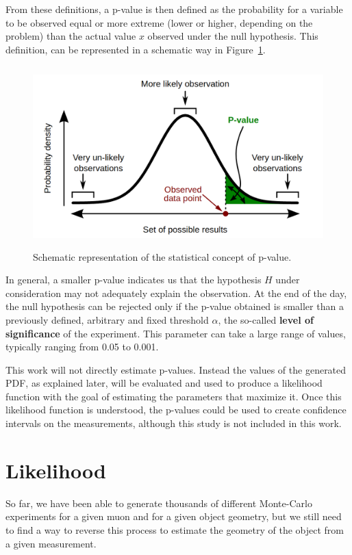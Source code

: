 \documentclass[a4paper, 11pt, twoside, openright]{report}
\begin{document}
From these definitions, a p-value is then defined as the probability for a variable to be observed equal or more extreme (lower or higher, depending on the problem) than the actual value $x$ observed under the null hypothesis. This definition, can be represented in a schematic way in Figure~\ref{fig:pvalue}.

\begin{figure}[htbp]
\centering
\includegraphics[width=13cm, height=7cm]{figs/pvalue.png}
\caption{Schematic representation of the statistical concept of p-value.}
\label{fig:pvalue}
\end{figure}

In general, a smaller p-value indicates us that the hypothesis $H$ under consideration may not adequately explain the observation. At the end of the day, the null hypothesis can be rejected only if the p-value obtained is smaller than a previously defined, arbitrary and fixed threshold $\alpha$, the so-called \textbf{level of significance} of the experiment. This parameter can take a large range of values, typically ranging from 0.05 to 0.001.

This work will not directly estimate p-values. Instead the values of the generated PDF, as explained later, will be evaluated and used to produce a likelihood function with the goal of estimating the parameters that maximize it. Once this likelihood function is understood, the p-values could be used to create confidence intervals on the measurements, although this study is not included in this work. 

\section{Likelihood} \label{sec:Likelihood}

So far, we have been able to generate thousands of different Monte-Carlo experiments for a given muon and for a given object geometry, but we still need to find a way to reverse this process to estimate the geometry of the object from a given measurement. 
\end{document}
